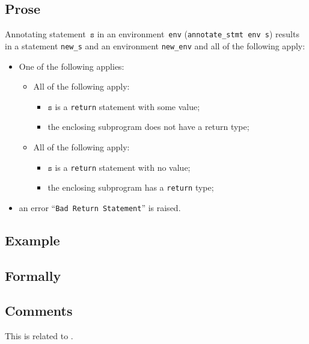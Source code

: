 \documentclass{book}
\newcommand\vs[0]{\texttt{s}}
\begin{document}
\begin{itemize}
  \subsection{Prose}
Annotating statement~$\vs$ in an environment~\texttt{env}
(\texttt{annotate\_stmt env s}) results in a statement \texttt{new\_s} and an
environment \texttt{new\_env} and all of the following apply:
   \begin{itemize}
   \item One of the following applies:
     \begin{itemize}
     \item All of the following apply:
       \begin{itemize}
       \item $\vs$ is a \texttt{return} statement with some value;
       \item the enclosing subprogram does not have a return type;
       \end{itemize}
     \item All of the following apply:
       \begin{itemize}
       \item $\vs$ is a \texttt{return} statement with no value;
       \item the enclosing subprogram has a \texttt{return} type;
       \end{itemize}
     \end{itemize}
   \item an error ``\texttt{Bad Return Statement}'' is raised.
   \end{itemize}

  \subsection{Example}



\begin{emptyformal}
    \subsection{Formally}
\end{emptyformal}

\subsection{Comments}
    This is related to .


\end{itemize}
\end{document}
